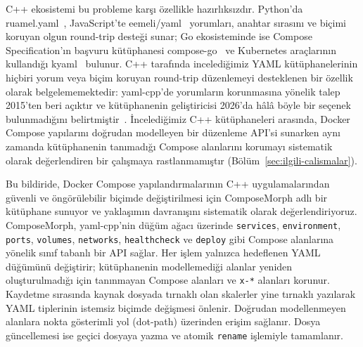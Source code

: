 \documentclass[conference]{IEEEtran}
\begin{document}
C++ ekosistemi bu probleme karşı özellikle hazırlıksızdır. Python'da
ruamel.yaml~\cite{ruamelyaml}, JavaScript'te eemeli/yaml~\cite{eemeliyaml}
yorumları, anahtar sırasını ve biçimi koruyan olgun round-trip desteği
sunar; Go ekosisteminde ise Compose Specification'ın başvuru kütüphanesi
compose-go~\cite{composego} ve Kubernetes araçlarının kullandığı
kyaml~\cite{kyaml} bulunur. C++ tarafında incelediğimiz YAML
kütüphanelerinin hiçbiri yorum veya biçim koruyan round-trip düzenlemeyi
desteklenen bir özellik olarak belgelememektedir: yaml-cpp'de yorumların
korunmasına yönelik talep 2015'ten beri açıktır ve kütüphanenin geliştiricisi
2026'da hâlâ böyle bir seçenek bulunmadığını belirtmiştir~\cite{yamlcpp_issue154,yamlcpp_issue457}.
İncelediğimiz C++ kütüphaneleri arasında, Docker Compose yapılarını doğrudan
modelleyen bir düzenleme API'si sunarken aynı zamanda kütüphanenin
tanımadığı Compose alanlarını korumayı sistematik olarak değerlendiren bir
çalışmaya rastlanmamıştır (Bölüm~\ref{sec:ilgili-calismalar}).

Bu bildiride, Docker Compose yapılandırmalarının C++ uygulamalarından
güvenli ve öngörülebilir biçimde değiştirilmesi için ComposeMorph adlı bir
kütüphane sunuyor ve yaklaşımın davranışını sistematik olarak
değerlendiriyoruz. ComposeMorph, yaml-cpp'nin düğüm ağacı üzerinde
\texttt{services}, \texttt{environment}, \texttt{ports},
\texttt{volumes}, \texttt{networks}, \texttt{healthcheck} ve
\texttt{deploy} gibi Compose alanlarına yönelik sınıf tabanlı bir API
sağlar. Her işlem yalnızca hedeflenen YAML düğümünü değiştirir; kütüphanenin
modellemediği alanlar yeniden oluşturulmadığı için tanınmayan Compose
alanları ve \texttt{x-*} alanları korunur. Kaydetme sırasında kaynak
dosyada tırnaklı olan skalerler yine tırnaklı yazılarak YAML tiplerinin
istemsiz biçimde değişmesi önlenir. Doğrudan modellenmeyen alanlara nokta
gösterimli yol (dot-path) üzerinden erişim sağlanır. Dosya güncellemesi ise
geçici dosyaya yazma ve atomik \texttt{rename} işlemiyle tamamlanır.
\end{document}
